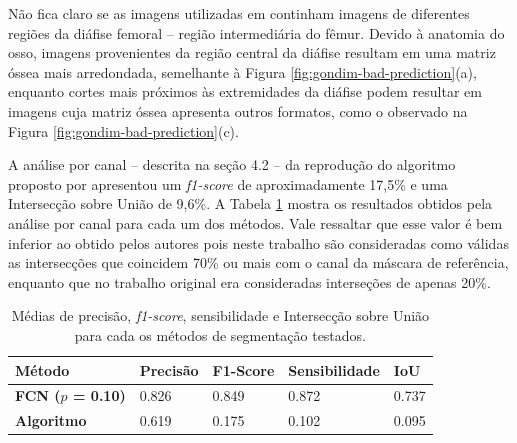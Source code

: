 Não fica claro se as imagens utilizadas em \cite{gondim2021automatic} continham imagens de diferentes regiões da diáfise femoral -- região intermediária do fêmur. Devido à anatomia do osso, imagens provenientes da região central da diáfise resultam em uma matriz óssea mais arredondada, semelhante à Figura \ref{fig:gondim-bad-prediction}(a), enquanto cortes mais próximos às extremidades da diáfise podem resultar em imagens cuja matriz óssea apresenta outros formatos, como o observado na Figura \ref{fig:gondim-bad-prediction}(c). 

A análise por canal -- descrita na seção 4.2 -- da reprodução do algoritmo proposto por \cite{gondim2021automatic} apresentou um \textit{f1-score} de aproximadamente 17,5\% e uma Intersecção sobre União de 9,6\%. A Tabela \ref{tab:metricas-comparacao-por-canal} mostra os resultados obtidos pela análise por canal para cada um dos métodos. Vale ressaltar que esse valor é bem inferior ao obtido pelos autores pois neste trabalho são consideradas como válidas as intersecções que coincidem 70\% ou mais com o canal da máscara de referência, enquanto que no trabalho original era consideradas interseções de apenas 20\%.


\begin{table}[h]
\center
\begin{tiny}
\begin{tabular}{|l|l|l|l|l|}
\hline
\rowcolor[HTML]{C0C0C0} 
\textbf{Método} & \textbf{Precisão} & \textbf{F1-Score} & \textbf{Sensibilidade}   & \textbf{IoU}     \\ 
\hline
\cellcolor[HTML]{EFEFEF}\textbf{FCN ($p$ = 0.10)} & 0.826 & 0.849 & 0.872 & 0.737 \\
\hline
\cellcolor[HTML]{EFEFEF}\textbf{Algoritmo \cite{gondim2021automatic}} & 0.619 & 0.175 & 0.102 & 0.095 \\
\hline
\end{tabular}
\end{tiny}
\caption{Médias de precisão, \textit{f1-score}, sensibilidade e Intersecção sobre União para cada os métodos de segmentação testados.}
    \label{tab:metricas-comparacao-por-canal}
\end{table}